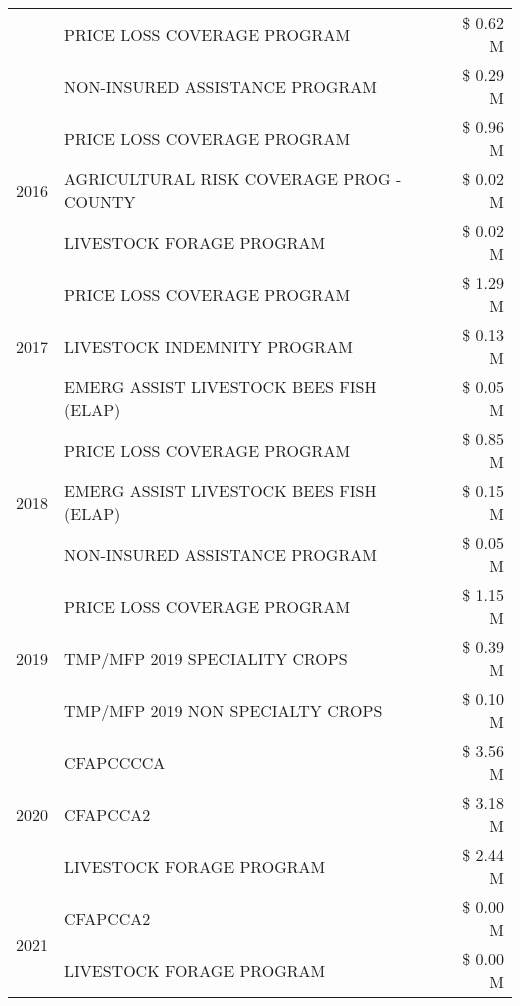 \begin{tabular}{llr}
 & PRICE LOSS COVERAGE PROGRAM & \$ 0.62 M \\
 & NON-INSURED ASSISTANCE PROGRAM & \$ 0.29 M \\
\cline{1-3}
\multirow[t]{3}{*}{2016} & PRICE LOSS COVERAGE PROGRAM & \$ 0.96 M \\
 & AGRICULTURAL RISK COVERAGE PROG - COUNTY & \$ 0.02 M \\
 & LIVESTOCK FORAGE PROGRAM & \$ 0.02 M \\
\cline{1-3}
\multirow[t]{3}{*}{2017} & PRICE LOSS COVERAGE PROGRAM & \$ 1.29 M \\
 & LIVESTOCK INDEMNITY PROGRAM & \$ 0.13 M \\
 & EMERG ASSIST LIVESTOCK BEES FISH (ELAP) & \$ 0.05 M \\
\cline{1-3}
\multirow[t]{3}{*}{2018} & PRICE LOSS COVERAGE PROGRAM & \$ 0.85 M \\
 & EMERG ASSIST LIVESTOCK BEES FISH (ELAP) & \$ 0.15 M \\
 & NON-INSURED ASSISTANCE PROGRAM & \$ 0.05 M \\
\cline{1-3}
\multirow[t]{3}{*}{2019} & PRICE LOSS COVERAGE PROGRAM & \$ 1.15 M \\
 & TMP/MFP 2019 SPECIALITY CROPS & \$ 0.39 M \\
 & TMP/MFP 2019 NON SPECIALTY CROPS & \$ 0.10 M \\
\cline{1-3}
\multirow[t]{3}{*}{2020} & CFAPCCCCA & \$ 3.56 M \\
 & CFAPCCA2 & \$ 3.18 M \\
 & LIVESTOCK FORAGE PROGRAM & \$ 2.44 M \\
\cline{1-3}
\multirow[t]{2}{*}{2021} & CFAPCCA2 & \$ 0.00 M \\
 & LIVESTOCK FORAGE PROGRAM & \$ 0.00 M \\
\cline{1-3}
\bottomrule
\end{tabular}
